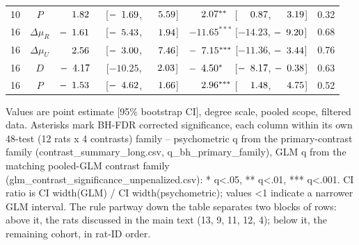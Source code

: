 \begin{longtable}{lcccc}
10 & $P$ & $\hphantom{-}\hphantom{0}1.82^{\hphantom{***}}$ [$-\hphantom{0}1.69$, $\hphantom{-}\hphantom{0}5.59$] & $\hphantom{-}\hphantom{0}2.07^{**\hphantom{*}}$ [$\hphantom{-}\hphantom{0}0.87$, $\hphantom{-}\hphantom{0}3.19$] & 0.32 \\
16 & $\Delta\mu_{R}$ & $-\hphantom{0}1.61^{\hphantom{***}}$ [$-\hphantom{0}5.43$, $\hphantom{-}\hphantom{0}1.94$] & $-11.65^{***}$ [$-14.23$, $-\hphantom{0}9.20$] & 0.68 \\
16 & $\Delta\mu_{U}$ & $\hphantom{-}\hphantom{0}2.56^{\hphantom{***}}$ [$-\hphantom{0}3.00$, $\hphantom{-}\hphantom{0}7.46$] & $-\hphantom{0}7.15^{***}$ [$-11.36$, $-\hphantom{0}3.44$] & 0.76 \\
16 & $D$ & $-\hphantom{0}4.17^{\hphantom{***}}$ [$-10.25$, $\hphantom{-}\hphantom{0}2.03$] & $-\hphantom{0}4.50^{*\hphantom{**}}$ [$-\hphantom{0}8.17$, $-\hphantom{0}0.38$] & 0.63 \\
16 & $P$ & $-\hphantom{0}1.53^{\hphantom{***}}$ [$-\hphantom{0}4.62$, $\hphantom{-}\hphantom{0}1.66$] & $\hphantom{-}\hphantom{0}2.96^{***}$ [$\hphantom{-}\hphantom{0}1.48$, $\hphantom{-}\hphantom{0}4.75$] & 0.52 \\
\end{longtable}
\vspace{4pt}
\par\noindent
\begin{minipage}{\linewidth}\small Values are point estimate [95\% bootstrap CI], degree scale, pooled scope, filtered data. Asterisks mark BH-FDR corrected significance, each column within its own 48-test (12 rats x 4 contrasts) family -- psychometric q from the primary-contrast family (contrast\_summary\_long.csv, q\_bh\_primary\_family), GLM q from the matching pooled-GLM contrast family (glm\_contrast\_significance\_unpenalized.csv): * q<.05, ** q<.01, *** q<.001. CI ratio is CI width(GLM) / CI width(psychometric); values <1 indicate a narrower GLM interval. The rule partway down the table separates two blocks of rows: above it, the rats discussed in the main text (13, 9, 11, 12, 4); below it, the remaining cohort, in rat-ID order.\end{minipage}